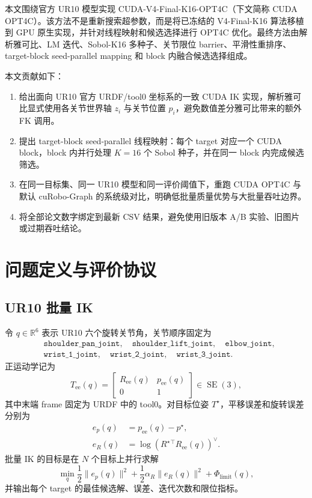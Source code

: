 \documentclass[twocolumn,a4paper,10pt]{ctexart}
\DeclareMathOperator{\SE}{SE}
\newcommand{\R}{\mathbb{R}}
\begin{document}
本文围绕官方 UR10 模型实现 CUDA-V4-Final-K16-OPT4C（下文简称 CUDA OPT4C）。该方法不是重新搜索超参数，而是将已冻结的 V4-Final-K16 算法移植到 GPU 原生实现，并针对线程映射和候选选择进行 OPT4C 优化。最终方法由解析雅可比、LM 迭代、Sobol-K16 多种子、关节限位 barrier、平滑性重排序、target-block seed-parallel mapping 和 block 内融合候选选择组成。

本文贡献如下：
\begin{enumerate}
  \item 给出面向 UR10 官方 URDF/tool0 坐标系的一致 CUDA IK 实现，解析雅可比显式使用各关节世界轴 $z_i$ 与关节位置 $p_i$，避免数值差分雅可比带来的额外 FK 调用。
  \item 提出 target-block seed-parallel 线程映射：每个 target 对应一个 CUDA block，block 内并行处理 $K=16$ 个 Sobol 种子，并在同一 block 内完成候选筛选。
  \item 在同一目标集、同一 UR10 模型和同一评价阈值下，重跑 CUDA OPT4C 与默认 cuRobo-Graph 的系统级对比，明确低批量质量优势与大批量吞吐边界。
  \item 将全部论文数字绑定到最新 CSV 结果，避免使用旧版本 A/B 实验、旧图片或过期吞吐结论。
\end{enumerate}

\section{问题定义与评价协议}

\subsection{UR10 批量 IK}

令 $q\in\R^6$ 表示 UR10 六个旋转关节角，关节顺序固定为
\begin{equation}
\begin{split}
&\texttt{shoulder\_pan\_joint},\quad
\texttt{shoulder\_lift\_joint},\quad
\texttt{elbow\_joint},\\
&\texttt{wrist\_1\_joint},\quad
\texttt{wrist\_2\_joint},\quad
\texttt{wrist\_3\_joint}.
\end{split}
\end{equation}
正运动学记为
\begin{equation}
T_{\mathrm{ee}}(q)=
\begin{bmatrix}
R_{\mathrm{ee}}(q) & p_{\mathrm{ee}}(q)\\
0 & 1
\end{bmatrix}\in\SE(3),
\end{equation}
其中末端 frame 固定为 URDF 中的 tool0。对目标位姿 $T^\star$，平移误差和旋转误差分别为
\begin{align}
e_p(q)&=p_{\mathrm{ee}}(q)-p^\star,\\
e_R(q)&=\log\!\left(R^\star{}^\top R_{\mathrm{ee}}(q)\right)^\vee .
\end{align}
批量 IK 的目标是在 $N$ 个目标上并行求解
\begin{equation}
\min_q \frac{1}{2}\|e_p(q)\|^2+\frac{1}{2}\alpha_R\|e_R(q)\|^2+\Phi_{\mathrm{limit}}(q),
\end{equation}
并输出每个 target 的最佳候选解、误差、迭代次数和限位指标。
\end{document}
